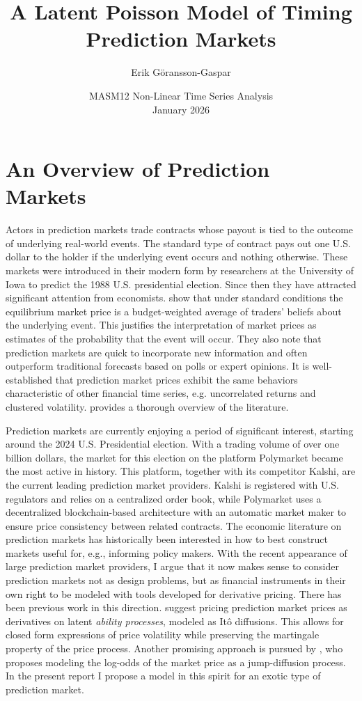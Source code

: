 \documentclass[a4paper, 12pt]{article}
\title{A Latent Poisson Model of Timing Prediction Markets}
\author{Erik Göransson-Gaspar}
\date{MASM12 Non-Linear Time Series Analysis \\
January 2026}
\begin{document}
\maketitle
\tableofcontents

\section{An Overview of Prediction Markets}
Actors in prediction markets trade contracts whose payout is tied to the outcome of underlying real-world events. The standard type of contract pays out one U.S. dollar to the holder if the underlying event occurs and nothing otherwise. These markets were introduced in their modern form by researchers at the University of Iowa to predict the 1988 U.S. presidential election. Since then they have attracted significant attention from economists. \citet{WolfersZitzewitz2006} show that under standard conditions the equilibrium market price is a budget-weighted average of traders' beliefs about the underlying event. This justifies the interpretation of market prices as estimates of the probability that the event will occur. They also note that prediction markets are quick to incorporate new information and often outperform traditional forecasts based on polls or expert opinions. It is well-established that prediction market prices exhibit the same behaviors characteristic of other financial time series, e.g. uncorrelated returns and clustered volatility. \citep{majumder2009} \citet{horn2014} provides a thorough overview of the literature.

Prediction markets are currently enjoying a period of significant interest, starting around the 2024 U.S. Presidential election. With a trading volume of over one billion dollars, the market for this election on the platform Polymarket became the most active in history. This platform, together with its competitor Kalshi, are the current leading prediction market providers. Kalshi is registered with U.S. regulators and relies on a centralized order book, while Polymarket uses a decentralized blockchain-based architecture with an automatic market maker to ensure price consistency between related contracts. The economic literature on prediction markets has historically been interested in how to best construct markets useful for, e.g., informing policy makers. With the recent appearance of large prediction market providers, I argue that it now makes sense to consider prediction markets not as design problems, but as financial instruments in their own right to be modeled with tools developed for derivative pricing. There has been previous work in this direction. \citet{archakIpeirotis2009} suggest pricing prediction market prices as derivatives on latent \textit{ability processes}, modeled as Itô diffusions. This allows for closed form expressions of price volatility while preserving the martingale property of the price process. Another promising approach is pursued by \citet{dalen2025}, who proposes modeling the log-odds of the market price as a jump-diffusion process. In the present report I propose a model in this spirit for an exotic type of prediction market. 
\end{document}

